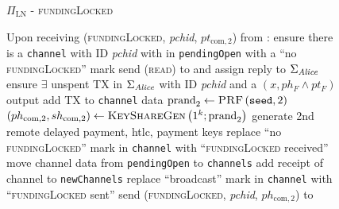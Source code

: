   \begin{figure}[H]
    \begin{protocolbox}{$\Pi_{\mathrm{LN}}$ - \textsc{fundingLocked}}
      \begin{algorithmic}[1]
        \State Upon receiving (\textsc{fundingLocked}, \textit{pchid},
        $pt_{\mathrm{com}, 2}$) from \bob:
        \Indent
          \State ensure there is a \texttt{channel} with ID \textit{pchid} with
          \bob{} in \texttt{pendingOpen} with a ``no \textsc{fundingLocked}''
          mark
           
            \State send (\textsc{read}) to \ledger{} and assign reply to
            $\Sigma_{\mathit{Alice}}$
            \State ensure $\exists$ unspent TX in $\Sigma_{\mathit{Alice}}$ with ID
            \textit{pchid} and a $\left(x, ph_F \wedge pt_F\right)$ output
            \State add TX to \texttt{channel} data
            \State $\mathrm{prand}_2 \gets \textsc{PRF}\left(\mathtt{seed},
            2\right)$
            \label{alg:protocol:fundingLocked:prand}
            \State $\left(ph_{\mathrm{com}, 2}, sh_{\mathrm{com}, 2}\right) \gets
            \textsc{KeyShareGen}\left(1^k; \mathrm{prand}_2\right)$
            \State generate 2nd remote delayed payment, htlc, payment keys
          \EndIf
          \State replace ``no \textsc{fundingLocked}'' mark in \texttt{channel}
          with ``\textsc{fundingLocked} received''
          \State move channel data from \texttt{pendingOpen} to
          \texttt{channels}
          \State add receipt of channel to \texttt{newChannels}
          \label{alg:protocol:fundingLocked:report}
            \State replace ``broadcast'' mark in \texttt{channel} with
            ``\textsc{fundingLocked} sent''
            \State send (\textsc{fundingLocked}, \textit{pchid},
            $ph_{\mathrm{com}, 2}$) to \bob{}
          \EndIf
        \EndIndent
      \end{algorithmic}
    \end{protocolbox}
    \caption{}
    \label{alg:protocol:fundingLocked}
  \end{figure}

